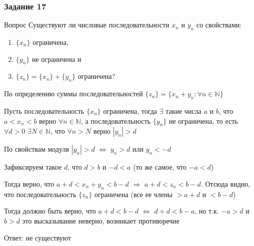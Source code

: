 \documentclass[8pt]{beamer}
\begin{document}
  \begin{frame}
    \frametitle{Задание 17}

    \begin{block}{Вопрос}
      Существуют ли числовые последовательности $x_n$ и $y_n$ со свойствами:
      \begin{enumerate}
        \item $\{x_n\}$ ограничена,
        \item $\{y_n\}$ не ограничена и
        \item $\{z_n\} = \{x_n\} + \{y_n\}$ ограничена?
      \end{enumerate}
    \end{block}

    По определению суммы последовательностей $\{z_n\} = \{x_n + y_n: \forall n \in \mathbb{N}\}$

    Пусть последовательность $\{x_n\}$ ограничена, тогда $\exists$ такие числа $a$ и $b$, что
    $a < x_n < b$ верно $\forall n \in \mathbb{N}$,
    а последовательность $\{y_n\}$ не ограничена, то есть $\forall d > 0$ $\exists N \in \mathbb{N}$,
    что $\forall n > N$ верно $|y_n| > d$

    По свойствам модуля $|y_n| > d$ $\Leftrightarrow$ $y_n > d$ или $y_n < -d$

    Зафиксируем такое $d$, что $d > b$ и $-d < a$ (то же самое, что $-a < d$)

    Тогда верно, что $a + d < x_n + y_n < b - d$ $\Rightarrow$ $a + d < z_n < b - d$. Отсюда
    видно, что последовательность $\{z_n\}$ ограничена (все ее члены $> a + d$ и $< b - d$)
    
    Тогда должно быть верно, что $a + d < b - d$ $\Leftrightarrow$ $d + d < b - a$,
    но т.к. $-a > d$ и $b > d$ это высказывание неверно, возникает противоречие

    \begin{flushright}
      Ответ: не существуют
    \end{flushright}
  \end{frame}
\end{document}
